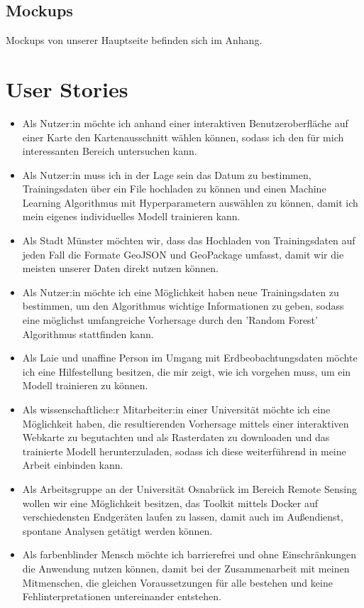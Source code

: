 \documentclass[a4paper,12pt]{article}
\begin{document}
\subsection{Mockups}
Mockups von unserer Hauptseite befinden sich im Anhang.


\section{User Stories}
\begin{itemize}
\item Als Nutzer:in möchte ich anhand einer interaktiven Benutzeroberfläche auf einer Karte den Kartenausschnitt wählen können, sodass ich den für mich interessanten Bereich untersuchen kann.
\item Als Nutzer:in muss ich in der Lage sein das Datum zu bestimmen, Trainingsdaten über ein File hochladen zu können und einen Machine Learning Algorithmus mit Hyperparametern auswählen zu können, damit ich mein eigenes individuelles Modell trainieren kann.
\item Als Stadt Münster möchten wir, dass das Hochladen von Trainingsdaten auf jeden Fall die Formate GeoJSON und GeoPackage umfasst, damit wir die meisten unserer Daten direkt nutzen können. 
\item Als Nutzer:in möchte ich eine Möglichkeit haben neue Trainingsdaten zu bestimmen, um den Algorithmus wichtige Informationen zu geben, sodass eine möglichst umfangreiche Vorhersage durch den 'Random Forest' Algorithmus stattfinden kann.
\item Als Laie und unaffine Person im Umgang mit Erdbeobachtungsdaten möchte ich eine Hilfestellung besitzen, die mir zeigt, wie ich vorgehen muss, um ein Modell trainieren zu können.
\item Als wissenschaftliche:r Mitarbeiter:in einer Universität möchte ich eine Möglichkeit haben, die resultierenden Vorhersage  mittels einer interaktiven Webkarte zu begutachten und als Rasterdaten zu downloaden und das trainierte Modell herunterzuladen, sodass ich diese weiterführend in meine Arbeit einbinden kann.
\item Als Arbeitsgruppe an der Universität Osnabrück im Bereich Remote Sensing wollen wir eine Möglichkeit besitzen, das Toolkit mittels Docker auf verschiedensten Endgeräten laufen zu lassen, damit auch im Außendienst, spontane Analysen getätigt werden können.
\item Als farbenblinder Mensch möchte ich barrierefrei und ohne Einschränkungen die Anwendung nutzen können, damit bei der Zusammenarbeit mit meinen Mitmenschen, die gleichen Voraussetzungen für alle bestehen und keine Fehlinterpretationen untereinander entstehen.

\end{itemize}
\end{document}

